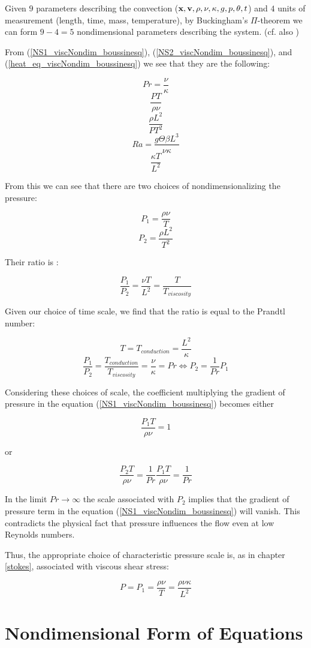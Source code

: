 Given $9$ parameters describing the convection ($\mathbf{x}, \mathbf{v}, \rho, \nu, \kappa, g, p, \theta, t$) and $4$ units of measurement (length, time, mass, temperature), by Buckingham's $\Pi$-theorem we can form $9 - 4 = 5$ nondimensional parameters describing the system. \cite{barenblatt1} (cf. also )

From (\ref{NS1_viscNondim_boussinesq}), (\ref{NS2_viscNondim_boussinesq}), and (\ref{heat_eq_viscNondim_boussinesq}) we see that they are the following:

$$ Pr = \frac{\nu}{\kappa} $$
$$ \frac{PT}{\rho \nu} $$
$$  \frac{\rho L^2}{PT^2}$$ 
$$ Ra = \frac{g\Theta \beta L^3}{\nu\kappa} $$
$$ \frac{\kappa T}{L^2} $$

From this we can see that there are two choices of nondimensionalizing the pressure:

$$ P_1 = \frac{\rho \nu}{T} $$
$$ P_2 = \frac{\rho L^2}{T^2}$$ 

Their ratio is :

$$ \frac{P_1}{P_2} = \frac{\nu T}{L^2} = \frac{T}{T_{viscosity}} $$

Given our choice of time scale, we find that the ratio is equal to the Prandtl number:

$$ T = T_{conduction} = \frac{L^2}{\kappa} $$
$$ \frac{P_1}{P_2} = \frac{T_{conduction}}{T_{viscosity}} = \frac{\nu}{\kappa} = Pr \Longleftrightarrow P_2 = \frac{1}{Pr} P_1 $$

Considering these choices of scale, the coefficient multiplying the gradient of pressure in the equation (\ref{NS1_viscNondim_boussinesq}) becomes either 

$$ \frac{P_1T}{\rho \nu} = 1$$

or 

$$ \frac{P_2T}{\rho \nu} = \frac{1}{Pr}\frac{P_1T}{\rho \nu} = \frac{1}{Pr}$$

In the limit $ Pr \longrightarrow \infty$ the scale associated with $P_2$ implies that the gradient of pressure term in the equation (\ref{NS1_viscNondim_boussinesq}) will vanish. This contradicts the physical fact that pressure influences the flow even at low Reynolds numbers.\cite[pp. 433-434]{leal}

Thus, the appropriate choice of characteristic pressure scale is, as in chapter \ref{stokes}, associated with viscous shear stress:

$$ P = P_1 = \frac{\rho \nu}{T} = \frac{\rho \nu \kappa}{L^2}$$

\section{Nondimensional Form of Equations}

